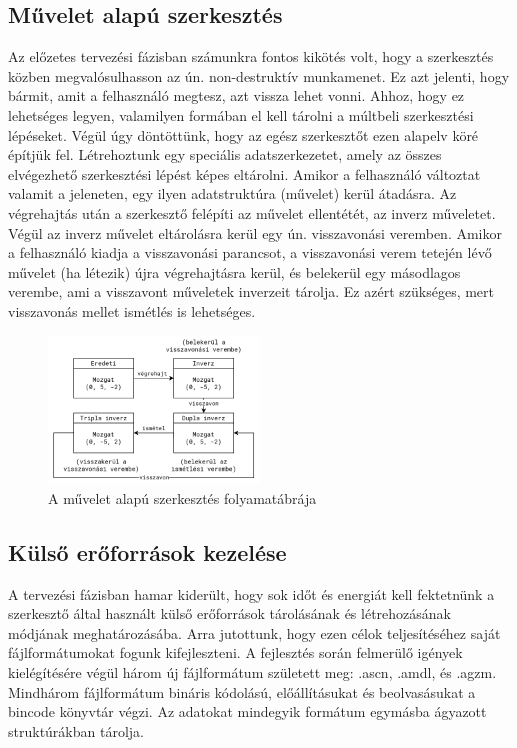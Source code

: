 \pagebreak

\subsection{Művelet alapú szerkesztés}

Az előzetes tervezési fázisban számunkra fontos kikötés volt, hogy a szerkesztés közben
megvalósulhasson az ún. non-destruktív munkamenet. Ez azt jelenti, hogy bármit, amit a felhasználó
megtesz, azt vissza lehet vonni. Ahhoz, hogy ez lehetséges legyen, valamilyen formában el kell
tárolni a múltbeli szerkesztési lépéseket. Végül úgy döntöttünk, hogy az egész szerkesztőt ezen
alapelv köré építjük fel. Létrehoztunk egy speciális adatszerkezetet, amely az összes elvégezhető
szerkesztési lépést képes eltárolni. Amikor a felhasználó változtat valamit a jeleneten, egy
ilyen adatstruktúra (művelet) kerül átadásra. Az végrehajtás után a szerkesztő felépíti az művelet
ellentétét, az inverz műveletet. Végül az inverz művelet eltárolásra kerül egy ún. visszavonási
veremben. Amikor a felhasználó kiadja a visszavonási parancsot, a visszavonási verem tetején lévő
művelet (ha létezik) újra végrehajtásra kerül, és belekerül egy másodlagos verembe, ami a visszavont
műveletek inverzeit tárolja. Ez azért szükséges, mert visszavonás mellet ismétlés is lehetséges.

\begin{figure}[h]
      \centering
      \includegraphics[width=0.5\textwidth]{parts/developer-documentation/editor/images/actions.png}
      \caption{A művelet alapú szerkesztés folyamatábrája}
\end{figure}

\subsection{Külső erőforrások kezelése}

A tervezési fázisban hamar kiderült, hogy sok időt és energiát kell fektetnünk a szerkesztő által
használt külső erőforrások tárolásának és létrehozásának módjának meghatározásába. Arra jutottunk,
hogy ezen célok teljesítéséhez saját fájlformátumokat fogunk kifejleszteni. A fejlesztés során
felmerülő igények kielégítésére végül három új fájlformátum született meg: .ascn, .amdl, és .agzm.
Mindhárom fájlformátum bináris kódolású, előállításukat és beolvasásukat a bincode könyvtár
végzi. Az adatokat mindegyik formátum egymásba ágyazott struktúrákban tárolja.

